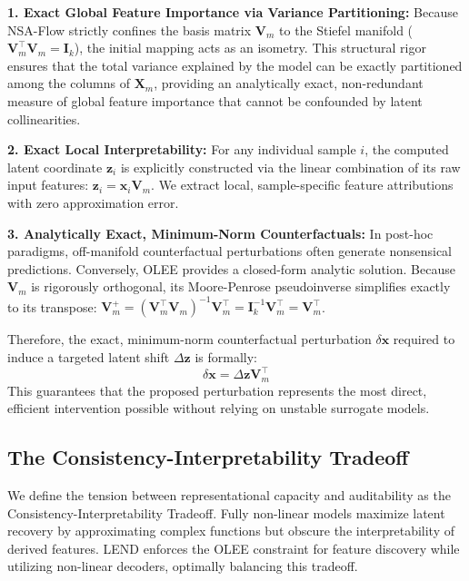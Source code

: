 \documentclass[
  letterpaper,
]{report}
\begin{document}
\textbf{1. Exact Global Feature Importance via Variance Partitioning:}
Because NSA-Flow strictly confines the basis matrix \(\mathbf{V}_m\) to
the Stiefel manifold
(\(\mathbf{V}_m^\top \mathbf{V}_m = \mathbf{I}_k\)), the initial mapping
acts as an isometry. This structural rigor ensures that the total
variance explained by the model can be exactly partitioned among the
columns of \(\mathbf{X}_m\), providing an analytically exact,
non-redundant measure of global feature importance that cannot be
confounded by latent collinearities.

\textbf{2. Exact Local Interpretability:} For any individual sample
\(i\), the computed latent coordinate \(\mathbf{z}_{i}\) is explicitly
constructed via the linear combination of its raw input features:
\(\mathbf{z}_{i} = \mathbf{x}_{i} \mathbf{V}_m\). We extract local,
sample-specific feature attributions with zero approximation error.

\textbf{3. Analytically Exact, Minimum-Norm Counterfactuals:} In
post-hoc paradigms, off-manifold counterfactual perturbations often
generate nonsensical predictions. Conversely, OLEE provides a
closed-form analytic solution. Because \(\mathbf{V}_m\) is rigorously
orthogonal, its Moore-Penrose pseudoinverse simplifies exactly to its
transpose:
\(\mathbf{V}_m^+ = (\mathbf{V}_m^\top \mathbf{V}_m)^{-1} \mathbf{V}_m^\top = \mathbf{I}_k^{-1} \mathbf{V}_m^\top = \mathbf{V}_m^\top\).

Therefore, the exact, minimum-norm counterfactual perturbation
\(\delta \mathbf{x}\) required to induce a targeted latent shift
\(\Delta \mathbf{z}\) is formally:
\[ \delta \mathbf{x} = \Delta \mathbf{z} \mathbf{V}_m^\top \] This
guarantees that the proposed perturbation represents the most direct,
efficient intervention possible without relying on unstable surrogate
models.

\subsection{The Consistency-Interpretability
Tradeoff}\label{the-consistency-interpretability-tradeoff}

We define the tension between representational capacity and auditability
as the Consistency-Interpretability Tradeoff. Fully non-linear models
maximize latent recovery by approximating complex functions but obscure
the interpretability of derived features. LEND enforces the OLEE
constraint for feature discovery while utilizing non-linear decoders,
optimally balancing this tradeoff.
\end{document}
